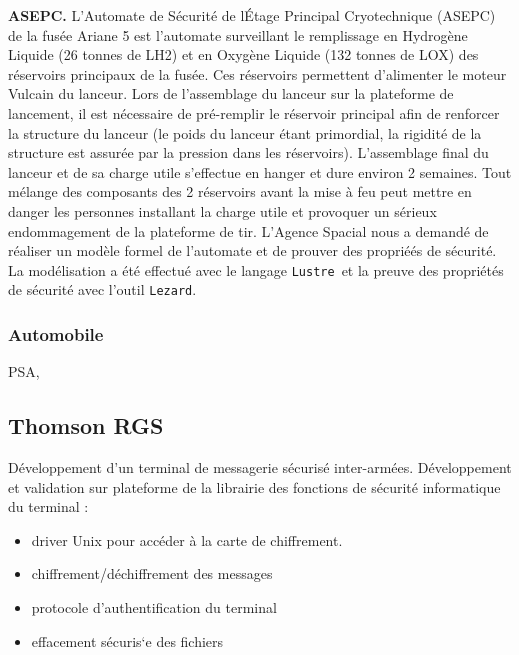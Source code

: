 \documentclass[a4paper,12pt]{article}
\newcommand{\Lustre}{{\tt Lustre}}
\newcommand{\Lezard}{{\tt Lezard}}
\newcommand{\smallspace}{\vspace{0.25cm}}
\begin{document}
\smallspace
\textbf{ASEPC.} L'Automate de S\'ecurit\'e de l\'Etage Principal
Cryotechnique (ASEPC) de la fus\'ee Ariane 5 est l'automate
surveillant le remplissage en Hydrog\`ene Liquide (26 tonnes de LH2)
et en Oxyg\`ene Liquide (132 tonnes de LOX) des r\'eservoirs
principaux de la fus\'ee. Ces r\'eservoirs permettent d'alimenter le
moteur Vulcain du lanceur.  Lors de l'assemblage du lanceur sur la
plateforme de lancement, il est n\'ecessaire de pr\'e-remplir le
r\'eservoir principal afin de renforcer la structure du lanceur (le
poids du lanceur \'etant primordial, la rigidit\'e de la structure est
assur\'ee par la pression dans les r\'eservoirs). L'assemblage final
du lanceur et de sa charge utile s'effectue en hanger et dure environ
2 semaines.  Tout m\'elange des composants des 2 r\'eservoirs avant la
mise à feu peut mettre en danger les personnes installant la charge
utile et provoquer un s\'erieux endommagement de la plateforme de
tir. L'Agence Spacial nous a demand\'e de r\'ealiser un mod\`ele
formel de l'automate et de prouver des propri\'e\'es de s\'ecurit\'e.
La mod\'elisation a \'et\'e effectu\'e avec le langage \Lustre\ et la
preuve des propri\'et\'es de s\'ecurit\'e avec l'outil \Lezard.

\subsubsection{Automobile}
PSA, 

\subsection{Thomson RGS}
D\'eveloppement d'un terminal de messagerie s\'ecuris\'e
inter-arm\'ees. D\'eveloppement et validation sur plateforme de la
librairie des fonctions de s\'ecurit\'e informatique du terminal :
\begin{itemize}
  \item driver Unix pour acc\'eder à la carte de chiffrement.
  \item chiffrement/d\'echiffrement des messages
  \item protocole d'authentification du terminal
  \item effacement s\'ecuris`e des fichiers
\end{itemize}

\newpage



\end{document}
